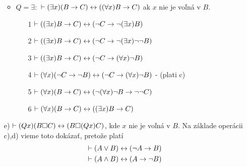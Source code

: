 \begin{dokaz}
\begin{itemize}
\begin{itemize}
        \item $Q=\exists:$ 
            $\vdash (\exists x) (B \rightarrow C) \leftrightarrow
             ((\forall x) B \rightarrow C)$ ak $x$ nie je voľná v $B$.
            \begin{itemize}
            \item[1]
                $\vdash ((\exists x) B \rightarrow C) \leftrightarrow
                    (\neg C \rightarrow \neg (\exists x) B)$
            \item[2]
                $\vdash ((\exists x) B \rightarrow C) \leftrightarrow
                    (\neg C \rightarrow \neg (\exists x) \neg \neg B)$
            \item[3]
                $\vdash ((\exists x) B \rightarrow C) \leftrightarrow
                (\neg C \rightarrow (\forall x) \neg B)$
            \item[4]
                $\vdash (\forall x) (\neg C \rightarrow \neg B)
                \leftrightarrow
                    (\neg C \rightarrow (\forall x) \neg B)$ - (plati c)
            \item[5]
                $\vdash (\forall x) (B \rightarrow C) \leftrightarrow
                    (\neg (\forall x) \neg B \rightarrow \neg \neg C)$
            \item[6]
                $\vdash (\forall x) (B \rightarrow C) \leftrightarrow
                    ((\exists x) B \rightarrow C)$
            \end{itemize}
        \end{itemize}
        \item[e)]
            $\vdash (Qx) (B\square C) \leftrightarrow (B\square (Qx)C)$,
            kde $x$ nie je voľná v $B$.
            Na základe operácii c),d) vieme toto dokázať, pretože platí
            \begin{align*}
                \vdash (A \lor B) \leftrightarrow (\neg A \rightarrow B) \\
                \vdash (A \land B) \leftrightarrow (A \rightarrow \neg B)
            \end{align*}
  \end{itemize}
\end{dokaz}

